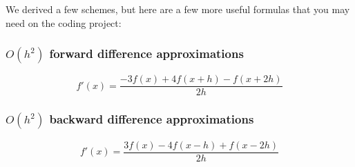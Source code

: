\documentclass[reqno]{amsart}
\theoremstyle{definition}
\begin{document}
We derived a few schemes, but here are a few more useful formulas that you may need on the coding project:

\subsubsection*{$O(h^2)$ forward difference approximations}

\begin{equation*}
f'(x) = \frac{-3f(x) + 4f(x+h) - f(x+2h)}{2h}
\end{equation*}

\subsubsection*{$O(h^2)$ backward difference approximations}

\begin{equation*}
f'(x) = \frac{3f(x) - 4f(x-h) + f(x-2h)}{2h}
\end{equation*}
\end{document}

